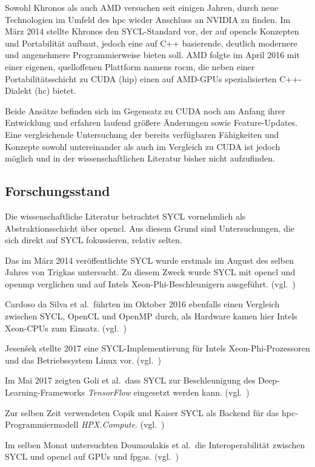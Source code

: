 Sowohl Khronos als auch AMD versuchen seit einigen Jahren, durch neue
Technologien im Umfeld des \gls{hpc} wieder Anschluss an NVIDIA zu finden. Im
März 2014 stellte Khronos den SYCL-Standard vor, der auf \gls{opencl}s Konzepten
und Portabilität aufbaut, jedoch eine auf C++ basierende, deutlich modernere
und angenehmere Programmierweise bieten soll. AMD folgte im April 2016 mit einer
eigenen, quelloffenen Plattform namens \gls{rocm}, die neben einer
Portabilitätsschicht zu CUDA (\gls{hip}) einen auf AMD-GPUs spezialisierten
C++-Dialekt (\gls{hc}) bietet.

Beide Ansätze befinden sich im Gegensatz zu CUDA noch am Anfang ihrer
Entwicklung und erfahren laufend größere Änderungen sowie Feature-Updates. Eine
vergleichende Untersuchung der bereits verfügbaren Fähigkeiten und Konzepte 
sowohl untereinander als auch im Vergleich zu CUDA ist jedoch möglich und in
der wissenschaftlichen Literatur bisher nicht aufzufinden.

\subsection{Forschungsstand}
\label{einleitung:forschung}

Die wissenschaftliche Literatur betrachtet SYCL vornehmlich als
Abstraktionsschicht über \gls{opencl}. Aus diesem Grund sind Untersuchungen, die
sich direkt auf SYCL fokussieren, relativ selten.

Das im März 2014 veröffentlichte SYCL wurde erstmals im August des selben Jahres
von Trigkas untersucht. Zu diesem Zweck wurde SYCL mit \gls{opencl} und
\gls{openmp} verglichen und auf Intels Xeon-Phi-Beschleunigern ausgeführt.
(vgl.~\cite{trigkas2014})

Cardoso da Silva et al.\ führten im Oktober 2016 ebenfalls einen Vergleich
zwischen SYCL, OpenCL und OpenMP durch, als Hardware kamen hier Intels Xeon-CPUs
zum Einsatz.
(vgl.~\cite{dasilva2016})

Jesenšek stellte 2017 eine SYCL-Implementierung für Intels
Xeon-Phi-Prozessoren und das Betriebssystem Linux vor.
(vgl.~\cite{jesensek2017})

Im Mai 2017 zeigten Goli et al.\, dass SYCL zur Beschleunigung des
Deep-Learning-Frameworks \textit{TensorFlow} eingesetzt werden kann.
(vgl.~\cite{goli2017})

Zur selben Zeit verwendeten Copik und Kaiser SYCL als Backend für das
\gls{hpc}-Programmiermodell \textit{HPX.Compute}.
(vgl.~\cite{copik2017})

Im selben Monat untersuchten Doumoulakis et al.\ die Interoperabilität zwischen
SYCL und \gls{opencl} auf GPUs und \gls{fpga}s.
(vgl.~\cite{doumoulakis2017})

